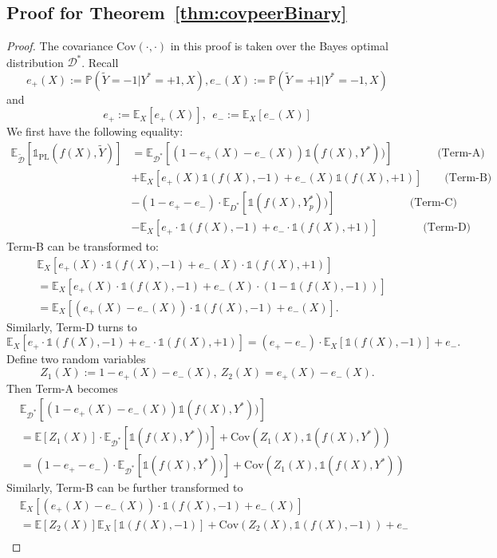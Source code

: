\documentclass[final]{cvpr}
\newcommand{\PP}{\mathbb P}
\newcommand{\BR}{\mathds 1}
\newcommand{\E}{\mathbb E}
\begin{document}
\subsection{Proof for Theorem~\ref{thm:covpeerBinary}}\label{proof:covpeerBinary}
\begin{proof}


The covariance $\text{Cov}(\cdot,\cdot)$ in this proof is taken over the Bayes optimal distribution $\mathcal D^*$.
Recall 
\[
e_+(X) := \PP(\widetilde{Y}=-1|Y^* = +1, X),
e_-(X) := \PP(\widetilde{Y}=+1|Y^* = -1, X)
\]
and 
\[
e_+ := \E_X [e_+(X)],~~ e_- := \E_X[e_-(X)]
\]
We first have the following equality:
\begin{align*}
\E_{\widetilde{\mathcal D}}[{\BR_{\text{PL}}}(f(X),\tilde{Y})] &= \E_{\mathcal D^*}[(1-e_+(X)-e_-(X)) \BR(f(X),Y^*))] \qquad \qquad \text{(Term-A)}\\
&+ \E_{X}[e_+(X)\BR(f(X),-1) + e_-(X)\BR(f(X),+1) ]   \qquad \text{(Term-B)}\\
&-(1-e_+-e_-) \cdot \E_{D^*}[\BR(f(X),Y^*_p))] \qquad\qquad\qquad~~~ \text{(Term-C)}\\
&-\E_{X}[e_+ \cdot \BR(f(X),-1) + e_- \cdot \BR(f(X),+1) ]  \qquad \qquad \text{(Term-D)}
\end{align*}
Term-B can be transformed to:
\begin{align*}
     &\E_{X}[e_+(X) \cdot \BR(f(X),-1) + e_-(X)\cdot \BR(f(X),+1) ]\\
     &= \E_{X}[e_+(X) \cdot \BR(f(X),-1) + e_-(X)\cdot (1-\BR(f(X),-1)) ]\\
     &=\E_{X}[(e_+(X)-e_-(X)) \cdot \BR(f(X),-1) + e_-(X)].
\end{align*}
Similarly, Term-D turns to
\[
\E_{X}[e_+ \cdot \BR(f(X),-1) + e_- \cdot \BR(f(X),+1) ] = (e_+ - e_-) \cdot \E_{X}[\BR(f(X),-1)] + e_-.
\]
Define two random variables
\[
Z_1(X):= 1-e_+(X)-e_-(X), ~Z_2(X) = e_+(X) - e_-(X).
\]
Then Term-A becomes
\begin{align*}
    &\E_{\mathcal D^*}[(1-e_+(X)-e_-(X)) \BR(f(X),Y^*))] \\
    &= \E[Z_1(X)] \cdot   \E_{\mathcal D^*}[ \BR(f(X),Y^*))] + \text{Cov}(Z_1(X),\BR(f(X),Y^*))\\
    &=(1-e_+-e_-) \cdot \E_{\mathcal D^*}[ \BR(f(X),Y^*))] + \text{Cov}(Z_1(X),\BR(f(X),Y^*))
\end{align*}
Similarly, Term-B can be further transformed to
\begin{align*}
    &\E_{X}[(e_+(X)-e_-(X)) \cdot \BR(f(X),-1) + e_-(X)] \\
    &= \E[Z_2(X)] \E_X[\BR(f(X),-1)] + \text{Cov}(Z_2(X),\BR(f(X),-1)) + e_-\\

\end{align*}
\end{proof}
\end{document}
